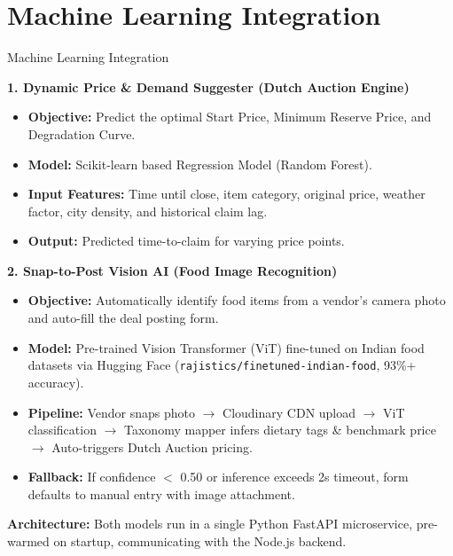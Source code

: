 \documentclass[aspectratio=169,xcolor=dvipsnames]{beamer}
\begin{document}
\section{Machine Learning Integration}
\begin{frame}{Machine Learning Integration}
\justifying
\scriptsize

\textbf{1. Dynamic Price \& Demand Suggester (Dutch Auction Engine)}
\begin{itemize}
    \item \textbf{Objective:} Predict the optimal Start Price, Minimum Reserve Price, and Degradation Curve.
    \item \textbf{Model:} Scikit-learn based Regression Model (Random Forest).
    \item \textbf{Input Features:} Time until close, item category, original price, weather factor, city density, and historical claim lag.
    \item \textbf{Output:} Predicted time-to-claim for varying price points.
\end{itemize}

\vspace{0.1cm}

\textbf{2. Snap-to-Post Vision AI (Food Image Recognition)}
\begin{itemize}
    \item \textbf{Objective:} Automatically identify food items from a vendor's camera photo and auto-fill the deal posting form.
    \item \textbf{Model:} Pre-trained Vision Transformer (ViT) fine-tuned on Indian food datasets via Hugging Face (\texttt{rajistics/finetuned-indian-food}, 93\%+ accuracy).
    \item \textbf{Pipeline:} Vendor snaps photo $\rightarrow$ Cloudinary CDN upload $\rightarrow$ ViT classification $\rightarrow$ Taxonomy mapper infers dietary tags \& benchmark price $\rightarrow$ Auto-triggers Dutch Auction pricing.
    \item \textbf{Fallback:} If confidence $<$ 0.50 or inference exceeds 2s timeout, form defaults to manual entry with image attachment.
\end{itemize}

\vspace{0.1cm}
\textbf{Architecture:} Both models run in a single Python FastAPI microservice, pre-warmed on startup, communicating with the Node.js backend.
\end{frame}
\end{document}
